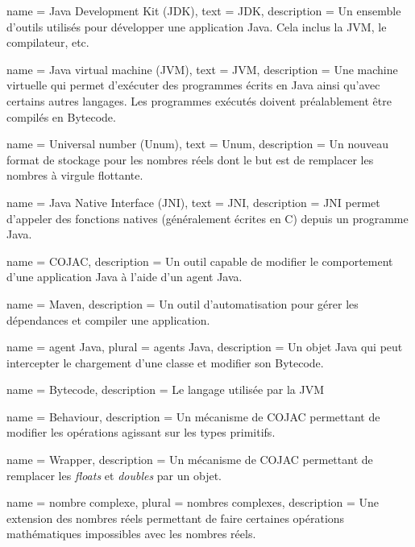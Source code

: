 
\makeglossaries

{
    name = {Java Development Kit (JDK)},
    text = {JDK},
    description = {Un ensemble d'outils utilisés pour développer une application Java. Cela inclus la JVM, le compilateur, etc.}
}

{
    name = {Java virtual machine (JVM)},
    text = {JVM},
    description = {Une machine virtuelle qui permet d'exécuter des programmes écrits en Java ainsi qu'avec certains autres langages. Les programmes exécutés doivent préalablement être compilés en Bytecode.}
}

{
    name = {Universal number (Unum)},
    text = {Unum},
    description = {Un nouveau format de stockage pour les nombres réels dont le but est de remplacer les nombres à virgule flottante.}
}

{
    name = {Java Native Interface (JNI)},
    text = {JNI},
    description = {JNI permet d'appeler des fonctions natives (généralement écrites en C) depuis un programme Java.}
}

{
    name = {COJAC},
    description = {Un outil capable de modifier le comportement d'une application Java à l'aide d'un agent Java.}
}

{
    name = {Maven},
    description = {Un outil d'automatisation pour gérer les dépendances et compiler une application.}
}

{
    name = {agent Java},
    plural = {agents Java},
    description = {Un objet Java qui peut intercepter le chargement d'une classe et modifier son Bytecode.}
}

{
    name = {Bytecode},
    description = {Le langage utilisée par la JVM}
}

{
    name = {Behaviour},
    description = {Un mécanisme de COJAC permettant de modifier les opérations agissant sur les types primitifs.}
}

{
    name = {Wrapper},
    description = {Un mécanisme de COJAC permettant de remplacer les \textit{floats} et \textit{doubles} par un objet.}
}

{
    name = {nombre complexe},
    plural = {nombres complexes},
    description = {Une extension des nombres réels permettant de faire certaines opérations mathématiques impossibles avec les nombres réels.}
}

